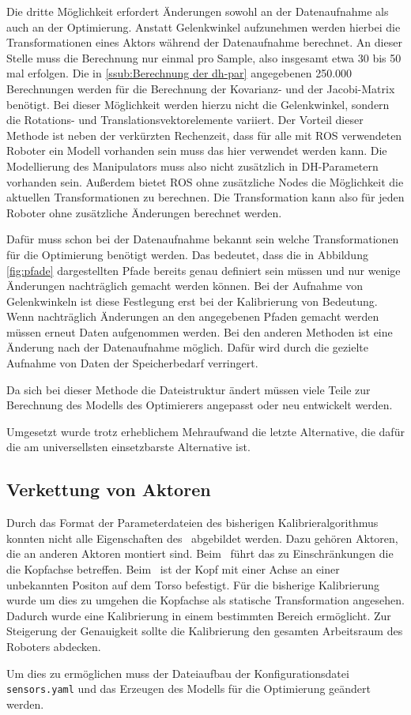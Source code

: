  Die dritte Möglichkeit erfordert Änderungen sowohl an der Datenaufnahme als auch an der Optimierung.
 Anstatt Gelenkwinkel aufzunehmen werden hierbei die Transformationen eines Aktors während der Datenaufnahme
 berechnet. An dieser Stelle muss die Berechnung nur einmal pro Sample, also insgesamt etwa 30 bis 50 mal 
 erfolgen. Die in \ref{ssub:Berechnung der dh-par} angegebenen 250.000 Berechnungen werden für die Berechnung 
 der Kovarianz- und der Jacobi-Matrix benötigt. Bei dieser Möglichkeit werden hierzu nicht die Gelenkwinkel,
 sondern die Rotations- und Translationsvektorelemente variiert.
 Der Vorteil dieser Methode ist neben der verkürzten Rechenzeit, dass für alle mit \ac{ROS} verwendeten 
 Roboter ein Modell vorhanden sein muss das hier verwendet werden kann. Die Modellierung des Manipulators
 muss also nicht zusätzlich in \ac{DH-Parameter}n vorhanden sein. Außerdem 
 bietet \ac{ROS} ohne zusätzliche Nodes die Möglichkeit die aktuellen Transformationen
 zu berechnen. Die Transformation kann also für jeden Roboter ohne zusätzliche
 Änderungen berechnet werden.
 
 Dafür muss schon bei der Datenaufnahme bekannt sein welche Transformationen für die Optimierung benötigt 
 werden. Das bedeutet, dass die in Abbildung \ref{fig:pfade} dargestellten Pfade bereits genau
 definiert sein müssen und nur wenige Änderungen nachträglich gemacht werden können. Bei der 
 Aufnahme von Gelenkwinkeln ist diese Festlegung erst bei der Kalibrierung von Bedeutung. 
 Wenn nachträglich Änderungen an den angegebenen Pfaden gemacht werden müssen 
 erneut Daten aufgenommen werden. Bei den anderen Methoden ist eine Änderung nach
 der Datenaufnahme möglich. Dafür wird durch die gezielte Aufnahme von Daten der
 Speicherbedarf verringert.

 Da sich bei dieser Methode die Dateistruktur ändert müssen viele Teile zur 
 Berechnung des Modells des Optimierers angepasst oder neu entwickelt werden. 


Umgesetzt wurde trotz erheblichem Mehraufwand die letzte Alternative, die dafür
die am universellsten einsetzbarste Alternative ist. 

\subsection{Verkettung von Aktoren}
\label{sub:Verkettung von Aktoren}

Durch das Format der Parameterdateien des bisherigen Kalibrieralgorithmus konnten
nicht alle Eigenschaften des \cob\ abgebildet werden. Dazu gehören Aktoren, die
an anderen Aktoren montiert sind. Beim \cob\ führt das zu Einschränkungen die 
die Kopfachse betreffen. Beim \cob\ ist der Kopf mit einer Achse an einer 
unbekannten Positon auf dem Torso befestigt. Für die bisherige Kalibrierung wurde
um dies zu umgehen die Kopfachse als statische Transformation angesehen. Dadurch
wurde eine Kalibrierung in einem bestimmten Bereich ermöglicht. Zur Steigerung
der Genauigkeit sollte die Kalibrierung den gesamten Arbeitsraum des Roboters
abdecken. 

Um dies zu ermöglichen muss der Dateiaufbau der Konfigurationsdatei 
\texttt{sensors.yaml} und das Erzeugen des Modells für die Optimierung geändert
werden.
